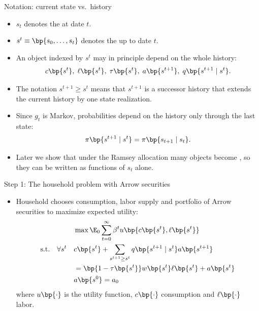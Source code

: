 \documentclass[11pt,xcolor={dvipsnames},aspectratio=159,hyperref={pdftex,pdfpagemode=UseNone,hidelinks,pdfdisplaydoctitle=true},usepdftitle=false]{beamer}
\begin{document}
	            \begin{frame}{Notation: current state vs.\ history}
	                \begin{itemize}
	                \item $s_t$ denotes the  at date $t$.
	                \item $s^t \equiv \bp{s_0,\dots,s_t}$ denotes the  up to date $t$.
	                \item An object indexed by $s^t$ may in principle depend on the whole history:
	                \[
	                c\bp{s^t},\; \ell\bp{s^t},\; \tau\bp{s^t},\; a\bp{s^{t+1}},\; q\bp{s^{t+1}\mid s^t}.
	                \]
	                \item The notation $s^{t+1}\ge s^t$ means that $s^{t+1}$ is a successor history that extends the current history by one state realization.
	                \item Since $g_t$ is Markov, probabilities depend on the history only through the last state:
	                \[
	                \pi\bp{s^{t+1}\mid s^t} = \pi\bp{s_{t+1}\mid s_t}.
	                \]
	                \item Later we show that under the Ramsey allocation many objects become , so they can be written as functions of $s_t$ alone.
	                \end{itemize}
	            \end{frame}
            \begin{frame}{Step 1: The household problem with Arrow securities}
            \begin{itemize}
            \item Household chooses consumption, labor supply and portfolio of Arrow securities to maximize expected utility:
            \begin{align*}  
                &\max \E_0 \sum_{t=0}^\infty  \beta^t u\bp{c \bp{s^t},\ell\bp{s^t}}\\
                \text{s.t.} \quad \forall s^t \quad & c\bp{s^t}  + \sum_{s^{t+1} \geq  s^t} q\bp{s^{t+1}\mid s^t} a \bp{s^{t+1}} \\ &=\bp{1 - \tau\bp{s^t} }w \bp{s^t} \ell\bp{s^t} + a \bp{s^{t}}  \\
                & a \bp{s^0}  = a_0 
                \end{align*}
                where $u\bp{\cdot}$ is the utility function, $c\bp{\cdot}$ consumption and $\ell \bp{\cdot}$ labor.
                  \end{itemize}
            \end{frame}
        
\end{document}
